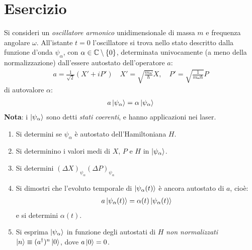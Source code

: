 \documentclass[../../FisicaTeorica.tex]{subfiles}
\begin{document}
\section{Esercizio \theEsercizio}
Si consideri un \textit{oscillatore armonico} unidimensionale di massa $m$ e frequenza angolare $\omega$. All'istante $t=0$ l'oscillatore si trova nello stato descritto dalla funzione d'onda $\psi_\alpha$, con $\alpha \in \mathbb{C}\setminus \{0\}$, determinata univocamente (a meno della normalizzazione) dall'essere autostato dell'operatore $a$:
\begin{align*}
a = \frac{1}{\sqrt{2}}(X' + iP')\quad X' = \sqrt{\frac{m\omega}{\hbar}}X, \quad P'=\sqrt{\frac{1}{m\omega \hbar}}P
\end{align*}
di autovalore $\alpha$:
\begin{align*}
a\Ket{\psi_\alpha}=\alpha \Ket{\psi_\alpha}
\end{align*}
\textbf{Nota}: i $\Ket{\psi_\alpha}$ sono detti \textit{stati coerenti}, e hanno applicazioni nei laser.
\begin{enumerate}
\item Si determini se $\psi_\alpha$ è autostato dell'Hamiltoniana $H$.
\item Si determinino i valori medi di $X$, $P$ e $H$ in $\Ket{\psi_\alpha}$.
\item Si determini $(\Delta X)_{\psi_\alpha}(\Delta P)_{\psi_\alpha}$
\item Si dimostri che l'evoluto temporale di $\Ket{\psi_\alpha(t)}$ è ancora autostato di $a$, cioè:
\begin{align*}
a \Ket{\psi_\alpha(t)} = \alpha(t) \Ket{\psi_\alpha(t)}
\end{align*}
e si determini $\alpha(t)$.
\item Si esprima $\Ket{\psi_\alpha}$ in funzione degli autostati di $H$ \textit{non normalizzati} $\Ket{n}\equiv (a^\dag)^n \Ket{0}$, dove $a \Ket{0}=0$.
\end{enumerate}
\end{document}
